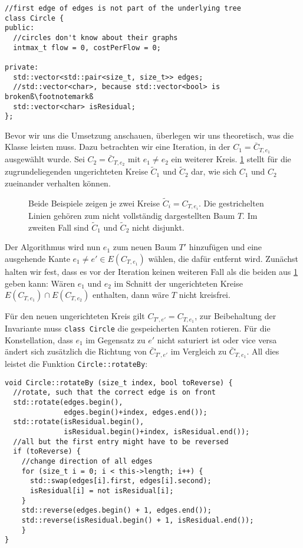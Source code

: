 \begin{lstlisting}[escapechar=ß]
//first edge of edges is not part of the underlying tree
class Circle {
public:
  //circles don't know about their graphs
  intmax_t flow = 0, costPerFlow = 0;

private:
  std::vector<std::pair<size_t, size_t>> edges;
  //std::vector<char>, because std::vector<bool> is brokenß\footnotemarkß
  std::vector<char> isResidual;
};
\end{lstlisting}

Bevor wir uns die Umsetzung anschauen, überlegen wir uns theoretisch, was die Klasse leisten muss. Dazu betrachten wir eine Iteration, in der $C_1=\bar{C}_{T,e_1}$ ausgewählt wurde. Sei $C_2=\bar{C}_{T,e_2}$ mit $e_1\neq e_2$ ein weiterer Kreis. \cref{fig:circles} stellt für die zugrundeliegenden ungerichteten Kreise $\tilde{C}_1$ und $\tilde{C}_2$ dar, wie sich $C_1$ und $C_2$ zueinander verhalten können.


\begin{figure}[!ht]\centering
    
    \caption{Beide Beispiele zeigen je zwei Kreise $\tilde{C}_i=C_{T,e_i}$. Die gestrichelten Linien gehören zum nicht vollständig dargestellten Baum $T$. Im zweiten Fall sind $\tilde{C}_1$ und $\tilde{C}_2$ nicht disjunkt.}
    \label{fig:circles}
\end{figure}

Der Algorithmus wird nun $e_1$ zum neuen Baum $T'$ hinzufügen und eine ausgehende Kante $e_1\neq e'\in E(C_{T,e_1})$ wählen, die dafür entfernt wird. Zunächst halten wir fest, dass es vor der Iteration keinen weiteren Fall als die beiden aus \cref{fig:circles} geben kann: Wären $e_1$ und $e_2$ im Schnitt der ungerichteten Kreise $E(C_{T,e_1})\cap E(C_{T,e_2})$ enthalten, dann wäre $T$ nicht kreisfrei.

Für den neuen ungerichteten Kreis gilt $C_{T',e'}=C_{T,e_1}$, zur Beibehaltung der Invariante muss \lstinline|class Circle| die gespeicherten Kanten rotieren. Für die Konstellation, dass $e_1$ im Gegensatz zu $e'$ nicht saturiert ist oder vice versa ändert sich zusätzlich die Richtung von $\bar{C}_{T',e'}$ im Vergleich zu $\bar{C}_{T,e_1}$. All dies leistet die Funktion \lstinline|Circle::rotateBy|:

\begin{lstlisting}
void Circle::rotateBy (size_t index, bool toReverse) {
  //rotate, such that the correct edge is on front
  std::rotate(edges.begin(),
              edges.begin()+index, edges.end());
  std::rotate(isResidual.begin(),
              isResidual.begin()+index, isResidual.end());
  //all but the first entry might have to be reversed
  if (toReverse) {
    //change direction of all edges
    for (size_t i = 0; i < this->length; i++) {
      std::swap(edges[i].first, edges[i].second);
      isResidual[i] = not isResidual[i];
    }
    std::reverse(edges.begin() + 1, edges.end());
    std::reverse(isResidual.begin() + 1, isResidual.end());
    }
}
\end{lstlisting}


